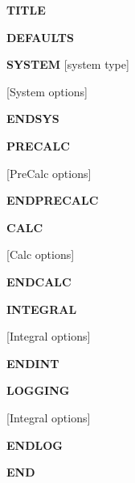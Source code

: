 \documentclass[openany,a4paper,10pt]{manual}
\begin{document}
\textbf{TITLE}

\textbf{DEFAULTS}

\textbf{SYSTEM} {[}system type{]}

{[}System options{]}

\textbf{ENDSYS}

\textbf{PRECALC}

{[}PreCalc options{]}

\textbf{ENDPRECALC}

\textbf{CALC}

{[}Calc options{]}

\textbf{ENDCALC}

\textbf{INTEGRAL}

{[}Integral options{]}

\textbf{ENDINT}

\textbf{LOGGING}

{[}Integral options{]}

\textbf{ENDLOG}

\textbf{END}
\end{document}
